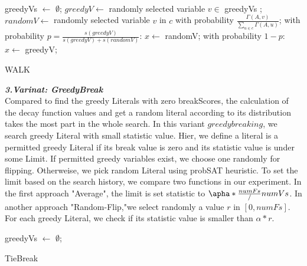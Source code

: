 \documentclass[12pt,a4paper,twoside]{scrartcl}
\numberwithin{equation}{section}
\begin{document}
 \\
\begin{algorithm}[H]
 greedyVs $\leftarrow$ $\emptyset$;\;
  $greedyV \leftarrow$   randomly selected variable $v \in$ greedyVs  ; \;
  $randomV \leftarrow$ randomly selected  variable $v$ in $c$ with probability $\frac{\Gamma(A,v)}{\sum_{u \in c}\Gamma(A,u)}$;  \;
  with probability $p = \frac{s(greedyV)}{s(greedyV)+s(randomV)}$: $x\leftarrow$ randomV;\;
    with probability $1-p$: $x\leftarrow$ greedyV;\;
\caption{WALK}
\end{algorithm} 
 \emph{\textbf{3.Varinat: GreedyBreak}}\\
 Compared to find the greedy Literals with zero breakScores, the calculation of the decay function \Gamma values and get a random literal according to its distribution takes the most part in the whole search. In this variant $greedybreaking$, we search greedy Literal with small statistic value.  Hier, we define a literal is a permitted greedy Literal if its break value is zero and its statistic value is under some Limit. If permitted greedy variables exist, we choose one randomly for flipping. Otherweise, we pick random Literal using probSAT heuristic. To set the limit based on the search history, we compare two functions in our experiment. In the first approach "Average", the limit is set statistic to $\apha *\frac{numFs}/{numVs}$. In another approach "Random-Flip,"we select randomly a value $r $ in $[0, numFs]$. For each greedy Literal, we check if its statistic value is smaller than $\alpha * r$. 
\begin{algorithm}[H]
  greedyVs $\leftarrow$ $\emptyset$;\;
  \;
\caption{TieBreak}
\end{algorithm} 
\end{document}
